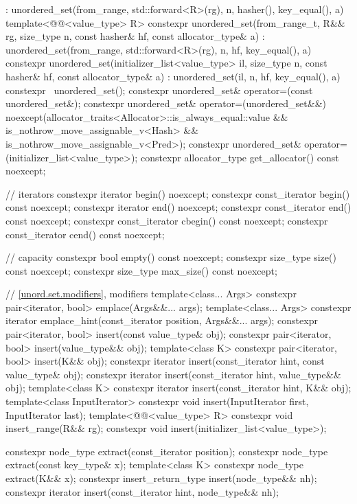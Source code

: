 \begin{codeblock}
{{        : unordered_set(from_range, std::forward<R>(rg), n, hasher(), key_equal(), a) { }
    template<@@<value_type> R>
      constexpr unordered_set(from_range_t, R&& rg, size_type n, const hasher& hf,
                              const allocator_type& a)
        : unordered_set(from_range, std::forward<R>(rg), n, hf, key_equal(), a) { }
    constexpr unordered_set(initializer_list<value_type> il, size_type n, const hasher& hf,
                            const allocator_type& a)
      : unordered_set(il, n, hf, key_equal(), a) { }
    constexpr ~unordered_set();
    constexpr unordered_set& operator=(const unordered_set&);
    constexpr unordered_set& operator=(unordered_set&&)
      noexcept(allocator_traits<Allocator>::is_always_equal::value &&
               is_nothrow_move_assignable_v<Hash> && is_nothrow_move_assignable_v<Pred>);
    constexpr unordered_set& operator=(initializer_list<value_type>);
    constexpr allocator_type get_allocator() const noexcept;

    // iterators
    constexpr iterator       begin() noexcept;
    constexpr const_iterator begin() const noexcept;
    constexpr iterator       end() noexcept;
    constexpr const_iterator end() const noexcept;
    constexpr const_iterator cbegin() const noexcept;
    constexpr const_iterator cend() const noexcept;

    // capacity
    constexpr bool empty() const noexcept;
    constexpr size_type size() const noexcept;
    constexpr size_type max_size() const noexcept;

    // \ref{unord.set.modifiers}, modifiers
    template<class... Args> constexpr pair<iterator, bool> emplace(Args&&... args);
    template<class... Args>
      constexpr iterator emplace_hint(const_iterator position, Args&&... args);
    constexpr pair<iterator, bool> insert(const value_type& obj);
    constexpr pair<iterator, bool> insert(value_type&& obj);
    template<class K> constexpr pair<iterator, bool> insert(K&& obj);
    constexpr iterator insert(const_iterator hint, const value_type& obj);
    constexpr iterator insert(const_iterator hint, value_type&& obj);
    template<class K> constexpr iterator insert(const_iterator hint, K&& obj);
    template<class InputIterator> constexpr void insert(InputIterator first, InputIterator last);
    template<@@<value_type> R>
      constexpr void insert_range(R&& rg);
    constexpr void insert(initializer_list<value_type>);

    constexpr node_type extract(const_iterator position);
    constexpr node_type extract(const key_type& x);
    template<class K> constexpr node_type extract(K&& x);
    constexpr insert_return_type insert(node_type&& nh);
    constexpr iterator           insert(const_iterator hint, node_type&& nh);

}}
\end{codeblock}
